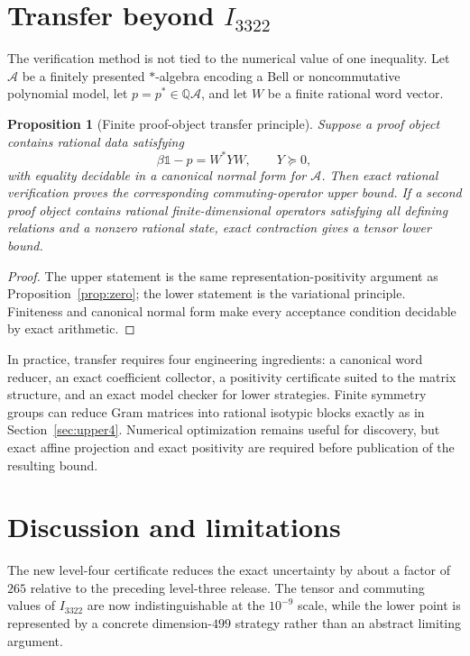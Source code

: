 \documentclass[11pt]{article}
\newtheorem{proposition}[theorem]{Proposition}
\newcommand{\1}{\mathbb{1}}
\newcommand{\Q}{\mathbb{Q}}
\begin{document}
\section{Transfer beyond \texorpdfstring{$I_{3322}$}{I3322}}\label{sec:transfer}
The verification method is not tied to the numerical value of one inequality.  Let $\mathcal A$ be a finitely presented $*$-algebra encoding a Bell or noncommutative polynomial model, let $p=p^*\in\Q\mathcal A$, and let $W$ be a finite rational word vector.

\begin{proposition}[Finite proof-object transfer principle]\label{prop:transfer}
Suppose a proof object contains rational data satisfying
\[
\beta\1-p=W^*YW,\qquad Y\succeq0,
\]
with equality decidable in a canonical normal form for $\mathcal A$.  Then exact rational verification proves the corresponding commuting-operator upper bound.  If a second proof object contains rational finite-dimensional operators satisfying all defining relations and a nonzero rational state, exact contraction gives a tensor lower bound.
\end{proposition}
\begin{proof}
The upper statement is the same representation-positivity argument as Proposition~\ref{prop:zero}; the lower statement is the variational principle.  Finiteness and canonical normal form make every acceptance condition decidable by exact arithmetic.
\end{proof}

In practice, transfer requires four engineering ingredients: a canonical word reducer, an exact coefficient collector, a positivity certificate suited to the matrix structure, and an exact model checker for lower strategies.  Finite symmetry groups can reduce Gram matrices into rational isotypic blocks exactly as in Section~\ref{sec:upper4}.  Numerical optimization remains useful for discovery, but exact affine projection and exact positivity are required before publication of the resulting bound.

\section{Discussion and limitations}\label{sec:discussion}
The new level-four certificate reduces the exact uncertainty by about a factor of $265$ relative to the preceding level-three release.  The tensor and commuting values of $I_{3322}$ are now indistinguishable at the $10^{-9}$ scale, while the lower point is represented by a concrete dimension-$499$ strategy rather than an abstract limiting argument.
\end{document}
